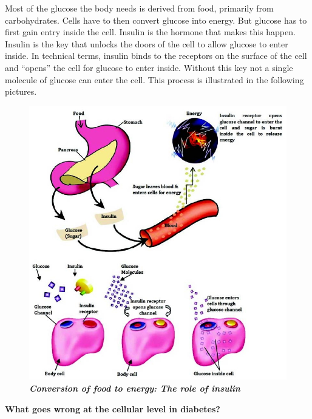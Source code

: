 Most of the glucose the body needs is derived from food, primarily from carbohydrates. Cells have to then convert glucose into energy. But glucose has to first gain entry inside the cell. Insulin is the hormone that makes this happen. Insulin is the key that unlocks the doors of the cell to allow glucose to enter inside. In technical terms, insulin binds to the receptors on the surface of the cell and “opens” the cell for glucose to enter inside. Without this key not a single molecule of glucose can enter the cell. This process is illustrated in the following pictures.

\begin{figure}[h]
\centering
\includegraphics[scale=2.3]{images/019.jpg}\\
\textbf{\textit{Conversion of food to energy: The role of insulin}}
\end{figure}

\newpage
\noindent
\textbf{What goes wrong at the cellular level in diabetes?}

